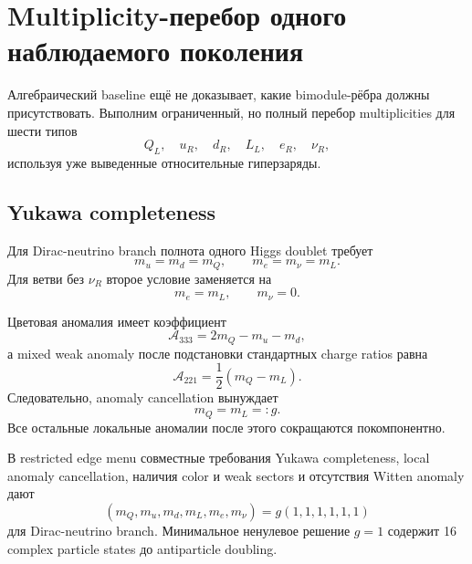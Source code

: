 \chapter{Multiplicity-перебор одного наблюдаемого поколения}

Алгебраический baseline ещё не доказывает, какие bimodule-рёбра должны
присутствовать. Выполним ограниченный, но полный перебор multiplicities для
шести типов
\begin{equation}
Q_L,\quad u_R,\quad d_R,\quad L_L,\quad e_R,\quad \nu_R,
\end{equation}
используя уже выведенные относительные гиперзаряды.

\section{Yukawa completeness}

Для Dirac-neutrino branch полнота одного Higgs doublet требует
\begin{equation}
m_u=m_d=m_Q,
\qquad
m_e=m_\nu=m_L.
\end{equation}
Для ветви без \(\nu_R\) второе условие заменяется на
\begin{equation}
m_e=m_L,
\qquad
m_\nu=0.
\end{equation}

Цветовая аномалия имеет коэффициент
\begin{equation}
\mathcal A_{333}=2m_Q-m_u-m_d,
\end{equation}
а mixed weak anomaly после подстановки стандартных charge ratios равна
\begin{equation}
\mathcal A_{221}=\frac12(m_Q-m_L).
\end{equation}
Следовательно, anomaly cancellation вынуждает
\begin{equation}
m_Q=m_L=:g.
\end{equation}
Все остальные локальные аномалии после этого сокращаются покомпонентно.

\begin{theorem}
В restricted edge menu совместные требования Yukawa completeness, local
anomaly cancellation, наличия color и weak sectors и отсутствия Witten
anomaly дают
\begin{equation}
(m_Q,m_u,m_d,m_L,m_e,m_\nu)=g(1,1,1,1,1,1)
\end{equation}
для Dirac-neutrino branch. Минимальное ненулевое решение \(g=1\) содержит
16 complex particle states до antiparticle doubling.
\end{theorem}

